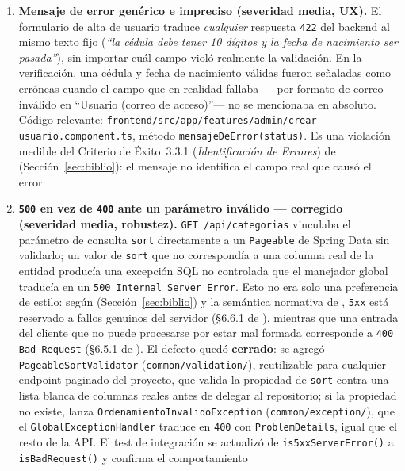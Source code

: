 \documentclass[12pt,a4paper]{article}
\begin{document}
\begin{enumerate}
  \item \textbf{Mensaje de error genérico e impreciso (severidad media, UX).} El formulario de
    alta de usuario traduce \emph{cualquier} respuesta \texttt{422} del backend al mismo texto
    fijo (\textit{``la cédula debe tener 10 dígitos y la fecha de nacimiento ser pasada''}),
    sin importar cuál campo violó realmente la validación. En la verificación, una cédula y
    fecha de nacimiento válidas fueron señaladas como erróneas cuando el campo que en
    realidad fallaba --- por formato de correo inválido en ``Usuario (correo de acceso)''--- no
    se mencionaba en absoluto. Código relevante:
    \texttt{frontend/src/app/features/admin/crear-usuario.component.ts}, método
    \texttt{mensajeDeError(status)}. Es una violación medible del Criterio de Éxito~3.3.1
    (\textit{Identificación de Errores}) de \textcite{wcag22} (Sección~\ref{sec:biblio}): el
    mensaje no identifica el campo real que causó el error.
  \item \textbf{\texttt{500} en vez de \texttt{400} ante un parámetro inválido --- \textbf{corregido}
    (severidad media, robustez).} \texttt{GET /api/categorias} vinculaba el parámetro de consulta
    \texttt{sort} directamente a un \texttt{Pageable} de Spring Data sin validarlo; un valor
    de \texttt{sort} que no correspondía a una columna real de la entidad producía una
    excepción SQL no controlada que el manejador global traducía en un
    \texttt{500 Internal Server Error}. Esto no era solo una preferencia de estilo: según
    \textcite{masse2011} (Sección~\ref{sec:biblio}) y la semántica normativa de
    \textcite{rfc7231}, \texttt{5xx} está reservado a fallos genuinos del servidor
    (\S6.6.1 de \textcite{rfc7231}), mientras que una entrada del cliente que no puede
    procesarse por estar mal formada corresponde a \texttt{400 Bad Request} (\S6.5.1 de
    \textcite{rfc7231}). El defecto quedó \textbf{cerrado}: se agregó
    \texttt{PageableSortValidator} (\texttt{common/validation/}), reutilizable para cualquier
    endpoint paginado del proyecto, que valida la propiedad de \texttt{sort} contra una lista
    blanca de columnas reales antes de delegar al repositorio; si la propiedad no existe,
    lanza \texttt{OrdenamientoInvalidoException} (\texttt{common/exception/}), que el
    \texttt{GlobalExceptionHandler} traduce en \texttt{400} con \texttt{ProblemDetails},
    igual que el resto de la API. El test de integración se actualizó de
    \texttt{is5xxServerError()} a \texttt{isBadRequest()} y confirma el comportamiento

\end{enumerate}
\end{document}

